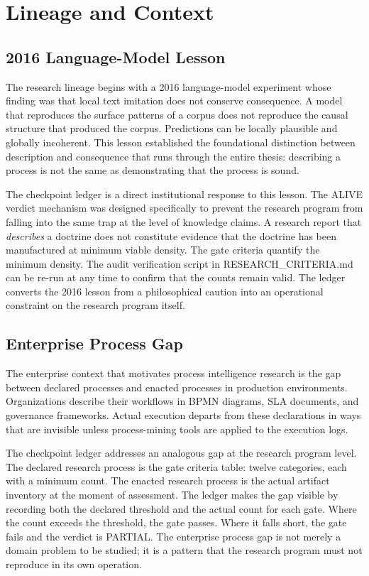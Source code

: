 \section{Lineage and Context}
\label{sec:checkpoints-lineage}

\subsection{2016 Language-Model Lesson}
\label{sec:checkpoints-lineage-2016}

The research lineage begins with a 2016 language-model experiment whose finding was that local text
imitation does not conserve consequence. A model that reproduces the surface patterns of a corpus
does not reproduce the causal structure that produced the corpus. Predictions can be locally
plausible and globally incoherent. This lesson established the foundational distinction between
description and consequence that runs through the entire thesis: describing a process is not the
same as demonstrating that the process is sound.

The checkpoint ledger is a direct institutional response to this lesson. The ALIVE verdict mechanism
was designed specifically to prevent the research program from falling into the same trap at the level
of knowledge claims. A research report that \emph{describes} a doctrine does not constitute evidence
that the doctrine has been manufactured at minimum viable density. The gate criteria quantify the
minimum density. The audit verification script in RESEARCH\_CRITERIA.md can be re-run at any time to
confirm that the counts remain valid. The ledger converts the 2016 lesson from a philosophical caution
into an operational constraint on the research program itself.

\subsection{Enterprise Process Gap}
\label{sec:checkpoints-lineage-enterprise-gap}

The enterprise context that motivates process intelligence research is the gap between declared
processes and enacted processes in production environments. Organizations describe their workflows in
BPMN diagrams, SLA documents, and governance frameworks. Actual execution departs from these
declarations in ways that are invisible unless process-mining tools are applied to the execution
logs.

The checkpoint ledger addresses an analogous gap at the research program level. The declared
research process is the gate criteria table: twelve categories, each with a minimum count. The
enacted research process is the actual artifact inventory at the moment of assessment. The ledger
makes the gap visible by recording both the declared threshold and the actual count for each gate.
Where the count exceeds the threshold, the gate passes. Where it falls short, the gate fails and the
verdict is PARTIAL. The enterprise process gap is not merely a domain problem to be studied; it is
a pattern that the research program must not reproduce in its own operation.

